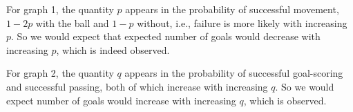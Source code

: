 For graph 1, the quantity $p$ appears in the probability of successful movement, $1-2p$ with the ball and $1-p$ without, i.e., failure is more likely with increasing $p$. So we would expect that expected number of goals would decrease with increasing $p$, which is indeed observed.

For graph 2, the quantity $q$ appears in the probability of successful goal-scoring and successful passing, both of which increase with increasing $q$. So we would expect number of goals would increase with increasing $q$, which is observed.
